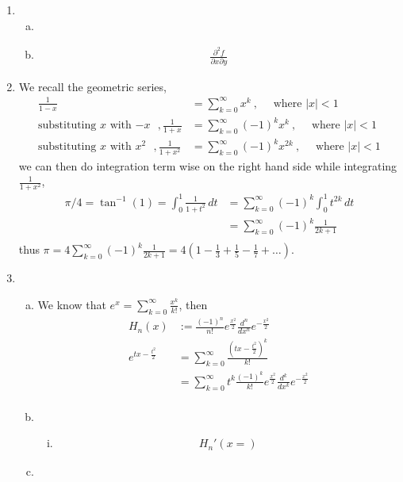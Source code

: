 \documentclass[a4paper,12pt]{article}
\theoremstyle{definition}
\begin{document}
\begin{enumerate}
\item
\begin{enumerate}[(a)]
\item


\item 
\begin{align*}
\frac{\partial^2f}{\partial x \partial y}
\end{align*}
\end{enumerate}

\item We recall the geometric series,
\begin{align*}
\frac{1}{1-x} &= \sum_{k=0}^{\infty}x^k~, \quad\text{ where $|x|<1$}\\
\text{substituting $x$ with $-x$ }, \frac{1}{1+x} &= \sum_{k=0}^{\infty}(-1)^kx^k~, \quad\text{ where $|x|<1$}\\
\text{substituting $x$ with $x^2$ }, \frac{1}{1+x^2} &= \sum_{k=0}^{\infty}(-1)^kx^{2k}~, \quad\text{ where $|x|<1$}
\end{align*}
we can then do integration term wise on the right hand side while integrating $\frac{1}{1+x^2}$,
\begin{align*}
\pi/4=\tan^{-1}(1) = \int_{0}^{1}\frac{1}{1+t^2}\,dt &= \sum_{k=0}^{\infty}(-1)^k\int_{0}^{1}t^{2k}\,dt\\
&= \sum_{k=0}^{\infty}(-1)^k\frac{1}{2k+1}\\
\end{align*}
thus $\pi = 4\sum_{k=0}^{\infty}(-1)^k\frac{1}{2k+1} = 4\left(1-\frac{1}{3}+\frac{1}{5}-\frac{1}{7}+\ldots\right)$.


\item
\begin{enumerate}[(a)]
\item We know that $e^x = \sum_{k=0}^{\infty}\frac{x^k}{k!}$, then 
\begin{align*}
H_n(x) &:= \frac{(-1)^n}{n!}e^{\frac{x^2}{2}}\frac{d^n}{dx^n}e^{-\frac{x^2}{2}}\\
e^{tx-\frac{t^2}{2}} &= \sum_{k=0}^{\infty}\frac{(tx-\frac{t^2}{2})^k}{k!} \\
&=\sum_{k=0}^{\infty}t^k \frac{(-1)^k}{k!}e^{\frac{x^2}{2}}\frac{d^k}{dx^k}e^{-\frac{x^2}{2}}\\
\end{align*}

\item
\begin{enumerate}[(i)]
\item \begin{align*}
H_n'(x = )
\end{align*}
\end{enumerate}

\item
\end{enumerate}
\end{enumerate}
\end{document}
